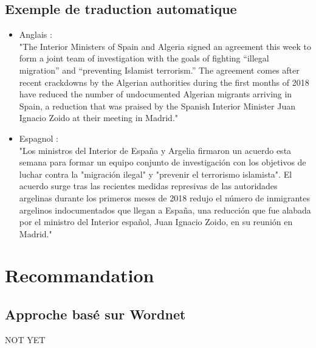     \subsection{Exemple de traduction automatique}
    \begin{itemize}
        \item Anglais :\\ 
        "The Interior Ministers of Spain and Algeria signed an agreement this week to form a joint team of investigation with the goals of fighting “illegal migration” and “preventing Islamist terrorism.” The agreement comes after recent crackdowns by the Algerian authorities during the first months of 2018 have reduced the number of undocumented Algerian migrants arriving in Spain, a reduction that was praised by the Spanish Interior Minister Juan Ignacio Zoido at their meeting in Madrid."\\
        \item Espagnol :\\
        "Los ministros del Interior de España y Argelia firmaron un acuerdo esta semana para formar un equipo conjunto de investigación con los objetivos de luchar contra la "migración ilegal" y "prevenir el terrorismo islamista". El acuerdo surge tras las recientes medidas represivas de las autoridades argelinas durante los primeros meses de 2018 redujo el número de inmigrantes argelinos indocumentados que llegan a España, una reducción que fue alabada por el ministro del Interior español, Juan Ignacio Zoido, en su reunión en Madrid."
    \end{itemize}

\section{Recommandation}
    \subsection{Approche basé sur Wordnet}    
    NOT YET


